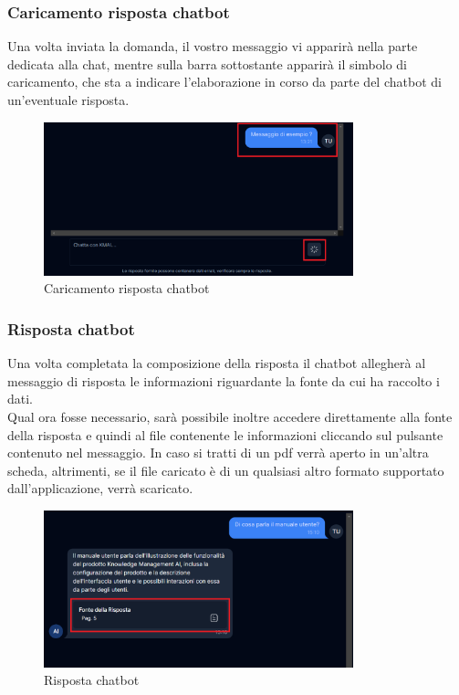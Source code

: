 \subsubsection{Caricamento risposta chatbot}
Una volta inviata la domanda, il vostro messaggio vi apparirà nella parte dedicata alla chat, mentre sulla barra sottostante apparirà il simbolo di caricamento, che sta a indicare l'elaborazione in corso da parte del chatbot di un'eventuale risposta.
\begin{figure}[h!]
    \centering
    \includegraphics[width=0.8\textwidth]{loadingchatresponse.png}
    \caption{Caricamento risposta chatbot}\label{fig:loadingchatresponse}
\end{figure}
\subsubsection{Risposta chatbot}
Una volta completata la composizione della risposta il chatbot allegherà al messaggio di risposta le informazioni riguardante la fonte da cui ha raccolto i dati.\\
Qual ora fosse necessario, sarà possibile inoltre accedere direttamente alla fonte della risposta e quindi al file contenente le informazioni cliccando sul pulsante contenuto nel messaggio.
In caso si tratti di un pdf verrà aperto in un’altra scheda, altrimenti, se il file caricato è di un qualsiasi altro formato supportato dall’applicazione, verrà scaricato.
\begin{figure}[h!]
    \centering
    \includegraphics[width=0.8\textwidth]{rispostachat.png}
    \caption{Risposta chatbot}\label{fig:rispostachat}
\end{figure}

